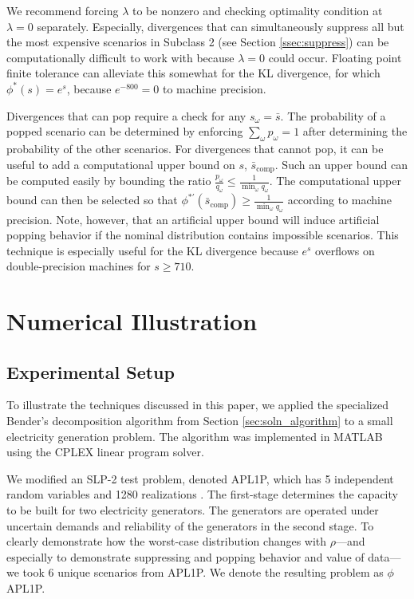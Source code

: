 \documentclass[opre,nonblindrev]{informs3} %
\begin{document}
We recommend forcing $\lambda$ to be nonzero and checking optimality condition at $\lambda = 0$ separately.
Especially, divergences that can simultaneously suppress all but the most expensive scenarios in Subclass 2 (see Section \ref{ssec:suppress}) can be computationally difficult to work with because $\lambda = 0$ could occur.
Floating point finite tolerance can alleviate this somewhat for the KL divergence, for which $\phi^*(s) = e^s$, because $e^{-800} = 0$ to machine precision.


Divergences that can pop require a check for any $s_\omega = \bar{s}$.
The probability of a popped scenario can be determined by enforcing $\sum_\omega p_\omega = 1$ after determining the probability of the other scenarios.
%
For divergences that cannot pop, it can be useful to add a computational upper bound on $s$, $\bar{s}_\text{comp}$.
Such an upper bound can be computed easily by bounding the ratio $\frac{p_\omega}{q_\omega} \leq \frac{1}{\min_\omega q_\omega}$.
The computational upper bound can then be selected so that $\phi^{*\prime}(\bar{s}_\text{comp}) \geq \frac{1}{\min_\omega q_\omega}$ according to machine precision.
Note, however, that an artificial upper bound will induce artificial popping behavior if the nominal distribution contains impossible scenarios.
This technique is especially useful for the KL divergence because $e^s$ overflows on double-precision machines for $s \geq 710$.



\section{Numerical Illustration} 
\label{sec:comp_results}

\subsection{Experimental Setup}
\label{ssec:csetup}

To illustrate the techniques discussed in this paper, we applied the specialized Bender's decomposition algorithm from Section \ref{sec:soln_algorithm} to a small electricity generation problem.
The algorithm was implemented in MATLAB using the CPLEX linear program solver. 

We modified an SLP-2 test problem, denoted APL1P, which has 5 independent random variables and 1280 realizations \citep{infanger1992monte}.
The first-stage determines the capacity to be built for two electricity generators.
The generators are operated under uncertain demands and reliability of the generators in the second stage.
To clearly demonstrate how the worst-case distribution changes with $\rho$---and especially to demonstrate suppressing and popping behavior and value of data---we took 6 unique scenarios from APL1P. 
We denote the resulting problem as $\phi$APL1P.
 
\end{document}
